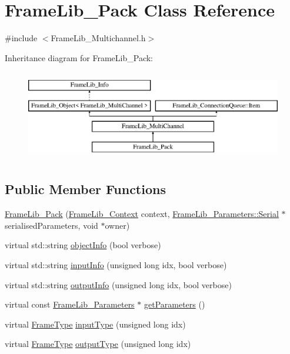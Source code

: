 \hypertarget{class_frame_lib___pack}{}\section{Frame\+Lib\+\_\+\+Pack Class Reference}
\label{class_frame_lib___pack}


{\ttfamily \#include $<$Frame\+Lib\+\_\+\+Multichannel.\+h$>$}

Inheritance diagram for Frame\+Lib\+\_\+\+Pack\+:\begin{figure}[H]
\begin{center}
\leavevmode
\includegraphics[height=4.000000cm]{class_frame_lib___pack}
\end{center}
\end{figure}
\subsection*{Public Member Functions}
\begin{DoxyCompactItemize}
\item 
\hyperlink{class_frame_lib___pack_aded2a9815261f73a8231f5df6c647ac2}{Frame\+Lib\+\_\+\+Pack} (\hyperlink{class_frame_lib___context}{Frame\+Lib\+\_\+\+Context} context, \hyperlink{class_frame_lib___parameters_1_1_serial}{Frame\+Lib\+\_\+\+Parameters\+::\+Serial} $\ast$serialised\+Parameters, void $\ast$owner)
\item 
virtual std\+::string \hyperlink{class_frame_lib___pack_aa15c5f54847d99c3bd3f9c2cf7688fd2}{object\+Info} (bool verbose)
\item 
virtual std\+::string \hyperlink{class_frame_lib___pack_ae9dacf16825332c2227cd9fd9af9db1d}{input\+Info} (unsigned long idx, bool verbose)
\item 
virtual std\+::string \hyperlink{class_frame_lib___pack_a40e71debefbc3e5e507e4f494e9efd68}{output\+Info} (unsigned long idx, bool verbose)
\item 
virtual const \hyperlink{class_frame_lib___parameters}{Frame\+Lib\+\_\+\+Parameters} $\ast$ \hyperlink{class_frame_lib___pack_a878bce4df2ece362d86cd03f742bc646}{get\+Parameters} ()
\item 
virtual \hyperlink{_frame_lib___types_8h_ad495a9f61af7fff07d7e97979d1ab854}{Frame\+Type} \hyperlink{class_frame_lib___pack_aba6a4e0ebdf5c40134f39f03cae80b29}{input\+Type} (unsigned long idx)
\item 
virtual \hyperlink{_frame_lib___types_8h_ad495a9f61af7fff07d7e97979d1ab854}{Frame\+Type} \hyperlink{class_frame_lib___pack_a59f695dc513fda6afa6bc0948c002533}{output\+Type} (unsigned long idx)
\end{DoxyCompactItemize}
